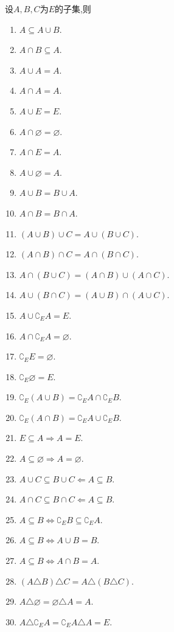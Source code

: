 \begin{prop}
    设$A,B,C$为$E$的子集,则
    \begin{enumerate}
        \item $A \subseteq A \cup B$.
        \item $A \cap B \subseteq A$.
        \item $A \cup A = A$.
        \item $A \cap A = A$.
        \item $A \cup E = E$.
        \item $A \cap \varnothing = \varnothing$.
        \item $A \cap E = A$.
        \item $A \cup \varnothing = A$.
        \item $A \cup B = B \cup A$.
        \item $A \cap B = B \cap A$.
        \item $(A \cup B) \cup C = A \cup (B \cup C)$.
        \item $(A \cap B) \cap C = A \cap (B \cap C)$.
        \item $A \cap (B \cup C)=(A \cap B) \cup (A \cap C)$.
        \item $A \cup (B \cap C)=(A \cup B) \cap (A \cup C)$.
        \item $A \cup \complement_E A = E$.
        \item $A \cap \complement_E A = \varnothing$.
        \item $\complement_E E = \varnothing$.
        \item $\complement_E \varnothing = E$.
        \item $\complement_E (A \cup B) = \complement_E A \cap \complement_E B$.
        \item $\complement_E (A \cap B) = \complement_E A \cup \complement_E B$.
        \item $E \subseteq A \Rightarrow A = E$.
        \item $A \subseteq \varnothing \Rightarrow A = \varnothing$.
        \item $A \cup C \subseteq B \cup C \Leftarrow A \subseteq B$.
        \item $A \cap C \subseteq B \cap C \Leftarrow A \subseteq B$.
        \item $A \subseteq B \iff \complement_E B \subseteq \complement_E A$.
        \item $A \subseteq B \iff A \cup B = B$.
        \item $A \subseteq B \iff A \cap B = A$.
        \item $(A \triangle B) \triangle C = A \triangle (B \triangle C)$.
        \item $A \triangle \varnothing = \varnothing \triangle A =A$.
        \item $A \triangle \complement_E A = \complement_E A \triangle A = E$.
    \end{enumerate}
\end{prop}

